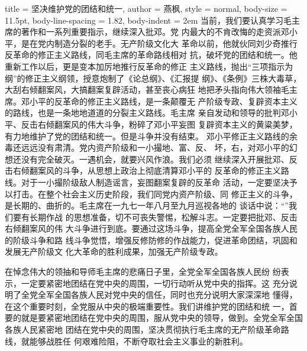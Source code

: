 \begin{hongqiarticle}{
        title  = {坚决维护党的团结和统一},
        author = {燕枫},
        style  = normal,
        body-size = 11.5pt,
        body-line-spacing = 1.82,
        body-indent = 2em
    }
    当前，我们要认真学习毛主席的著作和一系列重要指示，继续深入批邓。党
    内最大的不肯改悔的走资派邓小平，是在党内制造分裂的老手。无产阶级文化大
    革命以前，他就伙同刘少奇推行反革命的修正主义路线，同毛主席的革命路线相对
    抗，破坏党的团结和统一。他重新工作以后，更是变本加厉地推行反革命的修正
    主义路线，抛出“三项指示为纲”的修正主义纲领，授意炮制了《论总纲》、《汇报提
    纲》、《条例》三株大毒草，大刮右倾翻案风，大搞翻案复辟活动，甚至丧心病狂
    地把矛头指向伟大领袖毛主席。邓小平的反革命的修正主义路线，是一条颠覆无
    产阶级专政、复辟资本主义的路线，也是一条地地道道的分裂主义路线。毛主席
    亲自发动和领导的批判邓小平、反击右倾翻案风的伟大斗争，粉碎了邓小平妄图
    复辟资本主义的黄粱美梦，有力地维护了党的团结和统一。但是斗争并没有结束。
    邓小平修正主义路线的余毒还远远没有肃清。党内资产阶级和一小撮地、富、反、
    坏，右，对邓小平的幻想还没有完全破灭。一遇机会，就要兴风作浪。我们必须
    继续深入开展批邓、反击右倾翻案风的斗争，从思想上政治上彻底清算邓小平的
    反革命的修正主义路线。对于一小撮阶级敌人制造谣言，妄图翻案复辟的反革命
    活动，一定要坚决予以打击。在整个社会主义历史阶段，我们同党内资产阶级、同
    修正主义的斗争，是长期的、曲折的。毛主席在一九七一年八月至九月巡视各地的
    谈话中说：“”我们要有长期作战
    的思想准备，切不可丧失警惕，松解斗志。一定要把批邓、反击右倾翻案风的伟
    大斗争进行到底。要通过这场斗争，提高全党全军全国各族人民的阶级斗争和路
    线斗争觉悟，增强反修防修的作战能力，促进革命团结，巩固和发展无产阶级文
    化大革命的胜利成果，加强无产阶级专政。
    
    在悼念伟大的领抽和导师毛主席的悲痛日子里，全党全军全国各族人民纷
    纷表示，一定要紧密地团结在党中央的周围，一切行动听从党中央的指挥。这
    充分说明了全党全军全国各族人民对党中央的信任，同时也充分说明大家深深地
    懂得，在这个重要时刻，全党服从中央的极端重要性。我们讲维护党的团结和统
    一，首要的就是要紧密地团结在党中央的周围，服从党中央的领导，做到。全党全军全国各族人民紧密地
    团结在党中央的周围，坚决贯彻执行毛主席的无产阶级革命路线，就能够战胜任
    何艰难险阻，不断夺取社会主义事业的新胜利。
\end{hongqiarticle}